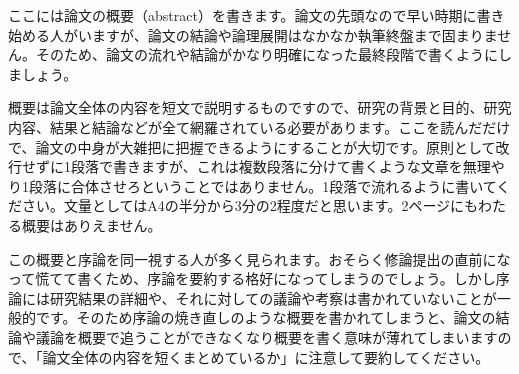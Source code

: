 ここには論文の概要（abstract）を書きます。論文の先頭なので早い時期に書き始める人がいますが、論文の結論や論理展開はなかなか執筆終盤まで固まりません。そのため、論文の流れや結論がかなり明確になった最終段階で書くようにしましょう。

概要は論文全体の内容を短文で説明するものですので、研究の背景と目的、研究内容、結果と結論などが全て網羅されている必要があります。ここを読んだだけで、論文の中身が大雑把に把握できるようにすることが大切です。原則として改行せずに1段落で書きますが、これは複数段落に分けて書くような文章を無理やり1段落に合体させろということではありません。1段落で流れるように書いてください。文量としてはA4の半分から3分の2程度だと思います。2ページにもわたる概要はありえません。

この概要と序論を同一視する人が多く見られます。おそらく修論提出の直前になって慌てて書くため、序論を要約する格好になってしまうのでしょう。しかし序論には研究結果の詳細や、それに対しての議論や考察は書かれていないことが一般的です。そのため序論の焼き直しのような概要を書かれてしまうと、論文の結論や議論を概要で追うことができなくなり概要を書く意味が薄れてしまいますので、「論文全体の内容を短くまとめているか」に注意して要約してください。
